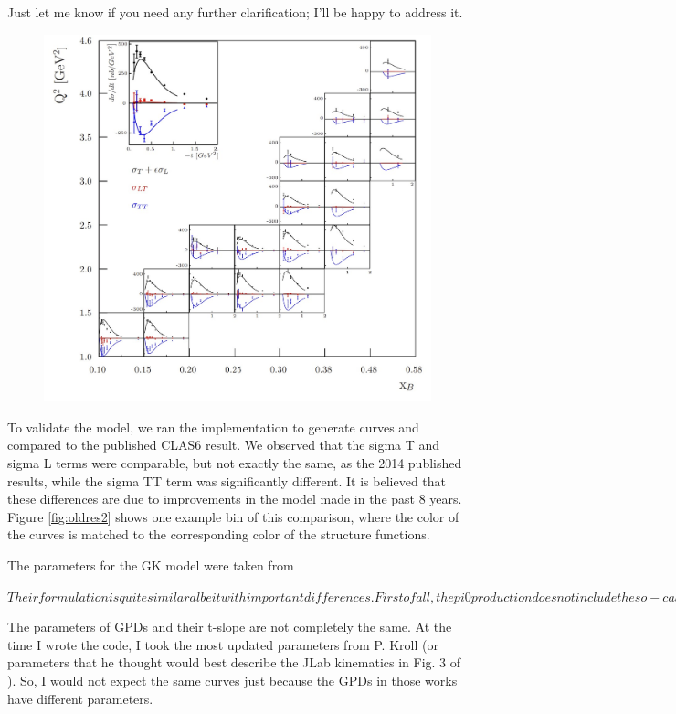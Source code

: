 Just let me know if you need any further clarification; I'll be happy to address it.







\begin{figure}[hbt]
	\centering
	\includegraphics[page=6,width=0.6\linewidth]{Chapters/Ch5-Further/GK_model/pics/clas6comp.jpg}
\end{figure}\label{fig:oldres}

To validate the model, we ran the implementation to generate curves and compared to the published CLAS6 result. We observed that the sigma T and sigma L terms were comparable, but not exactly the same, as the 2014 published results, while the sigma TT term was significantly different. It is believed that these differences are due to improvements in the model made in the past 8 years. Figure \ref{fig:oldres2} shows one example bin of this comparison, where the color of the curves is matched to the corresponding color of the structure functions.


The parameters for the GK model were taken from 

$
Their formulation is quite similar albeit with important differences. First of all, the pi0 production does not include the so-called pion-pole contribution (see Eq. 4.39 - 4.42 in my thesis). Moreover, their handbag contributions are slightly different. Their differences at the handbag level are discussed in Eq. 4.37 and 4.38 in my thesis. $

The parameters of GPDs and their t-slope are not completely the same. At the time I wrote the code, I took the most updated parameters from P. Kroll (or parameters that he thought would best describe the JLab kinematics in Fig. 3 of \cite{Diehl2020ExtractionKinematics} ). So, I would not expect the same curves just because the GPDs in those works have different parameters. 

